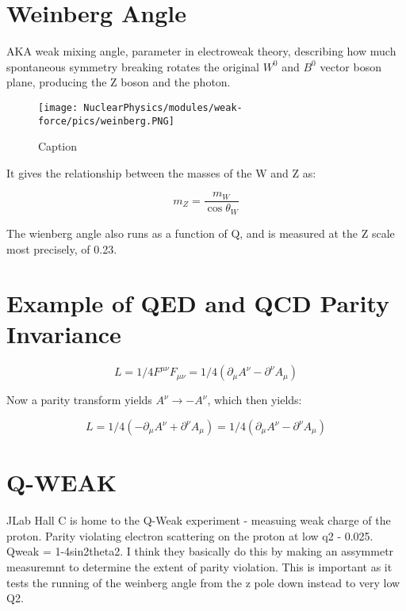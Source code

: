        
        
        \section{Weinberg Angle}
            AKA weak mixing angle, parameter in electroweak theory, describing how much spontaneous symmetry breaking rotates the original $W^0$ and $B^0$ vector boson plane, producing the Z boson and the photon. 
            
            \begin{figure}[H]
                \centering
                \texttt{[image: NuclearPhysics/modules/weak-force/pics/weinberg.PNG]}
            \caption{Caption}
            \end{figure}
            
            
            It gives the relationship between the masses of the W and Z as:
            
            \begin{equation}
                m_Z = \frac{m_W}{\cos\theta_W}
            \end{equation}
            
            The wienberg angle also runs as a function of Q, and is measured at the Z scale most precisely, of 0.23. 
        
        
        
        \section{Example of QED and QCD Parity Invariance}
            \begin{equation}
                L = 1/4 F^{\mu \nu} F_{\mu \nu} = 1/4 \left( \partial_{\mu} A^{\nu} - \partial^{\nu} A_{\mu} \right)
            \end{equation}
            
            Now a parity transform yields $A^{\nu} \longrightarrow -A^{\nu}$, which then yields:
            
            \begin{equation}
                L = 1/4 \left( -\partial_{\mu} A^{\nu} + \partial^{\nu} A_{\mu} \right) = 1/4 \left( \partial_{\mu} A^{\nu} - \partial^{\nu} A_{\mu} \right)
            \end{equation}
            
            
            
            \section{Q-WEAK}
                JLab Hall C is home to the Q-Weak experiment - measuing weak charge of the proton. Parity violating electron scattering on the proton at low q2 - 0.025. Qweak = 1-4sin2theta2. I think they basically do this by making an assymmetr measuremnt to determine the extent of parity violation. This is important as it tests the running of the weinberg angle from the z pole down instead to very low Q2. 
                
